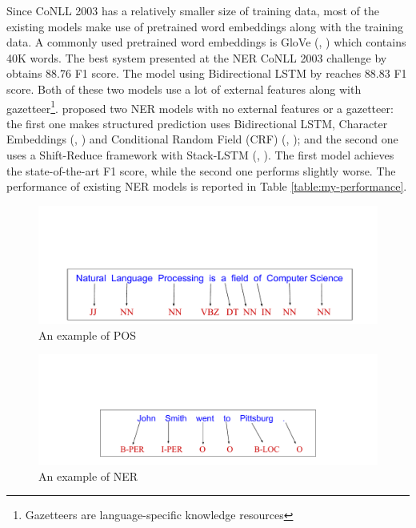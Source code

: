 Since CoNLL 2003 has a relatively smaller size of training data, most of the existing models make use of pretrained word embeddings along with the training data. A commonly used pretrained word embeddings is GloVe (\citeauthor{pennington2014glove}, \citeyear{pennington2014glove}) which contains 40K words. The best system presented at the NER CoNLL 2003 challenge by \cite{florian2003named} obtains 88.76 F1 score. The model using Bidirectional LSTM by \cite{huang2015bidirectional} reaches 88.83 F1 score. Both of these two models use a lot of external features along with gazetteer\footnote{Gazetteers are language-specific knowledge resources}. \cite{lample2016neural} proposed two NER models with no external features or a gazetteer: the first one makes structured prediction uses Bidirectional LSTM, Character Embeddings (\citeauthor{ling2015finding}, \citeyear{ling2015finding}) and Conditional Random Field (CRF) (\citeauthor{lafferty2001conditional}, \citeyear{lafferty2001conditional}); and the second one uses a Shift-Reduce framework with Stack-LSTM (\citeauthor{dyer2015transition}, \citeyear{dyer2015transition}). The first model achieves the state-of-the-art F1 score, while the second one performs slightly worse. The performance of existing NER models is reported in Table \ref{table:my-performance}.




\begin{figure}
  \centering
  \includegraphics[scale=0.5]{posex.pdf}
 \caption{An example of POS}
  \label{fig:pos-ex}
\end{figure}

\begin{figure}
  \centering
  \includegraphics[scale=0.5]{nerex.pdf}
 \caption{An example of NER}
  \label{fig:ner-ex}
\end{figure}

